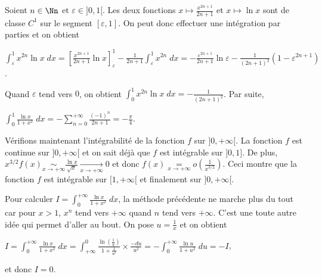 {{Soient $n\in\Nn$ et $\varepsilon\in]0,1[$. Les deux fonctions $x\mapsto\frac{x^{2n+1}}{2n+1}$ et $x\mapsto\ln x$ sont de classe $C^1$ sur le segment $[\varepsilon,1]$. On peut donc effectuer une intégration par parties et on obtient

\begin{center}
$\int_{\varepsilon}^{1}x^{2n}\ln x\;dx=\left[\frac{x^{2n+1}}{2n+1}\ln x\right]_\varepsilon^1-\frac{1}{2n+1}\int_{\varepsilon}^{1}x^{2n}\;dx=-\frac{\varepsilon^{2n+1}}{2n+1}\ln \varepsilon-\frac{1}{(2n+1)^2}(1-\varepsilon^{2n+1})$.
\end{center}

Quand $\varepsilon$ tend vers $0$, on obtient $\int_{0}^{1}x^{2n}\ln x\;dx=-\frac{1}{(2n+1)^2}$. Par suite,

\begin{center}
$\int_{0}^{1}\frac{\ln x}{1+x^2}\;dx=-\sum_{n=0}^{+\infty}\frac{(-1)^n}{2n+1}=-\frac{\pi}{4}$.
\end{center}

Vérifions maintenant l'intégrabilité de la fonction $f$ sur $]0,+\infty[$. La fonction $f$ est continue sur $]0,+\infty[$ et on sait déjà que $f$ est intégrable sur $]0,1]$. De plus, $x^{3/2}f(x)\underset{x\rightarrow+\infty}{\sim}\frac{\ln x}{\sqrt{x}}\underset{x\rightarrow+\infty}{\rightarrow}0$ et donc $f(x)\underset{x\rightarrow+\infty}{=}o\left(\frac{1}{x^{3/2}}\right)$. Ceci montre que la fonction $f$ est intégrable sur $[1,+\infty[$ et finalement sur $]0,+\infty[$.

Pour calculer $I=\int_{0}^{+\infty}\frac{\ln x}{1+x^2}\;dx$, la méthode précédente ne marche plus du tout  car pour $x>1$, $x^{n}$ tend vers $+\infty$ quand $n$ tend vers $+\infty$. C'est une toute autre idée qui permet d'aller au bout. On pose $u=\frac{1}{x}$ et on obtient

\begin{center}
$I=\int_{0}^{+\infty}\frac{\ln x}{1+x^2}\;dx=\int_{+\infty}^{0}\frac{\ln\left(\frac{1}{u}\right)}{1+\frac{1}{u^2}}\times\frac{-du}{u^2}=-\int_{0}^{+\infty}\frac{\ln u}{1+u^2}\;du=-I$,
\end{center}

et donc $I=0$.

\begin{center}
\end{center}}
}